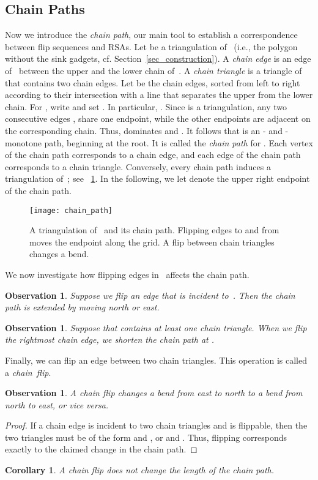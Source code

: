 \documentclass[a4paper,11pt]{article}
\newtheorem{corollary}[theorem]{Corollary}
\newtheorem{observation}[theorem]{Observation}
\newcommand{\noproof}{~\hfill}
\newcommand{\qedopt}{}
\newcommand{\ShoLong}[2]{#2}
\begin{document}
\subsection{Chain Paths}
\label{sec:triangulation_structure}

Now we introduce the \emph{chain path}, our main tool to
establish a correspondence between flip sequences and RSAs.
Let  be a triangulation of~ (i.e., the polygon  
without the sink gadgets, cf. Section~\ref{sec_construction}).
A \emph{chain edge} is an edge of~ between the upper and the lower 
chain of~. 
A \emph{chain triangle} is a triangle of~ that contains two chain edges.
Let  be the chain edges, sorted from left to 
right according to their intersection with a line
that separates the upper from the lower chain.
For , write  and set .
In particular, .
Since  is a triangulation, any two consecutive edges ,  share one endpoint, while the other endpoints are adjacent on the corresponding chain.
Thus,  dominates  and .
It follows that  is an - and -monotone path, 
beginning at the root.
It is called the \emph{chain path} for .
Each vertex of the chain path corresponds to a chain edge, and each 
edge of the chain path corresponds to a chain triangle. Conversely,
every chain path induces a triangulation  of~;
see \figurename~\ref{fig_chain_path}.
In the following, we let  denote the upper right endpoint of the 
chain path.
\begin{figure}
\centering
\texttt{[image: chain\_path]}
\caption{A triangulation of~ and its
chain path. Flipping edges to and from  moves the endpoint  along
the grid.
A flip between chain triangles changes a bend. 
}
\label{fig_chain_path}
\end{figure}
\ShoLong{}{We now investigate how flipping edges in~ affects the chain path.

\begin{observation}\label{obs_chain_path_monotone}
Suppose we flip an edge that is incident to~.
Then the chain path is extended by moving  north or east.\noproof
\end{observation}

\begin{observation}
Suppose that  contains at least one chain triangle.
When we flip the rightmost chain edge, we shorten the chain path at .\noproof
\end{observation}

Finally, we can flip an edge between two chain triangles.
This operation is called a \emph{chain~flip}.

\begin{observation}\label{lem_bend_chain_flip}
A chain flip changes a bend from east to north to a bend from north to east, or vice versa.
\end{observation}
\begin{proof}
If a chain edge  is incident to two chain triangles and is flippable, then the two triangles must be of the form  and
, or  and .
Thus, flipping  corresponds exactly to the claimed change in the chain path.
\qedopt
\end{proof}
}\ShoLong{}{\begin{corollary}
A chain flip does not change the length of the chain path.\noproof
\end{corollary}
}
\end{document}
